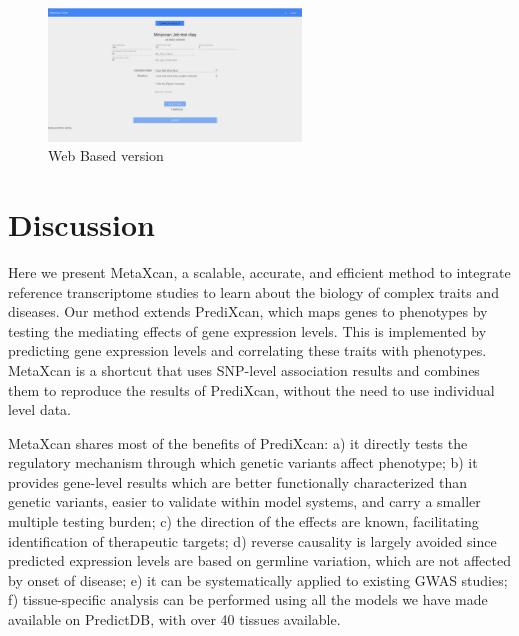 \documentclass[10pt]{article}
\begin{document}
\begin{figure}
\includegraphics[width=0.6\textwidth]{plots/WebAppExample.png}
\caption{ Web Based version}
\label{fig:webapp}
\end{figure}

\section*{Discussion}

Here we present MetaXcan, a scalable, accurate, and efficient method to integrate reference transcriptome studies to learn about the biology of complex traits and diseases. Our method extends PrediXcan, which maps genes to phenotypes by testing the mediating effects of gene expression levels. This is implemented by predicting gene expression levels  and correlating these traits with phenotypes. MetaXcan is a shortcut that uses SNP-level association results and combines them to reproduce the results of PrediXcan, without the need to use individual level data.

MetaXcan shares most of the benefits of PrediXcan: a) it directly tests the regulatory mechanism through which genetic variants affect phenotype; b) it provides gene-level results which are better functionally characterized than genetic variants, easier to validate within model systems, and carry a smaller multiple testing burden; c) the direction of the effects are known, facilitating identification of therapeutic targets; d) reverse causality is largely avoided since predicted expression levels are based on germline variation, which are not affected by onset of disease; e) it can be systematically applied to existing GWAS studies; f) tissue-specific analysis can be performed using all the models we have made available on PredictDB, with over 40 tissues available.
%
%
%
\end{document}
